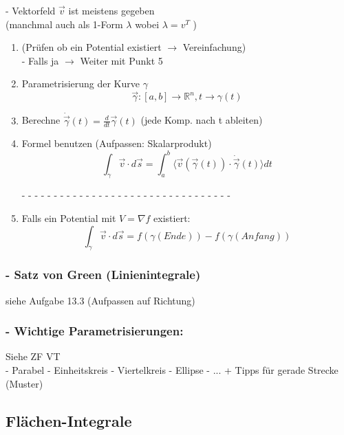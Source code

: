 \documentclass[6pt]{article}
\begin{document}
\begin{multicols*}{3}
		- Vektorfeld $\vec{v}$ ist meistens gegeben \\
		(manchmal auch als 1-Form $\lambda$  wobei $\lambda = v^T$ )
		
		\begin{enumerate}
			\item 	(Pr{\"u}fen ob ein Potential existiert $\rightarrow$ Vereinfachung) \\
						- Falls ja $\rightarrow $ Weiter mit Punkt 5
			\item	Parametrisierung der Kurve $\gamma$ \\
						\[
						\vec{\gamma} : [a,b] \rightarrow \mathbb{R}^n, t \rightarrow \gamma(t)
						\]
			\item 	Berechne $\dot{\vec{\gamma}}(t) = \frac{d}{dt}\vec{\gamma}(t)$ (jede Komp. nach 		t ableiten)
			\item 	Formel benutzen (Aufpassen: Skalarprodukt)	\\
						\[
							\int_{\gamma} \vec{v} \cdot d\vec{s} = \int_{a}^{b} \langle\vec{v}(\vec{\gamma}(t)) \cdot \dot{\vec{\gamma}}(t)\rangle dt 
						\]
			
			- - - - - - - - - - - - - - - - - - - - - - - - - - - - - - - - - 
			\item 	Falls ein Potential mit $V = \nabla f$ existiert:\\
						\[
							\int_{\gamma} \vec{v} \cdot d\vec{s} = f(\gamma(Ende)) - f(\gamma(Anfang)) 		
						\]
		
		\end{enumerate}


		\vspace{2mm} 
		
		\subsubsection*{- Satz von Green (Linienintegrale)}
		siehe Aufgabe 13.3 (Aufpassen auf Richtung)
		
		
		\subsubsection*{- Wichtige Parametrisierungen:}
		Siehe ZF VT \\
		- Parabel
		- Einheitskreis
		- Viertelkreis
		- Ellipse
		- ...
		+ Tipps für gerade Strecke (Muster)
		
		
		\columnbreak
		\subsection*{Fl{\"a}chen-Integrale}
		

\end{multicols*}
\end{document}
